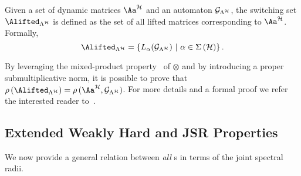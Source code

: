 %
\begin{definition}%
    \label{def:switching_set}%
    Given a set of dynamic matrices $\Aa^{\strat}$ and an automaton $\mathcal{G}_{\Lambda^{\mathcal{H}}}$, the switching set $\Alifted_{\Lambda^\strat}$ is defined as the set of all lifted matrices corresponding to $\Aa^{\strat}$.
    Formally,
    \begin{equation*}
        \Alifted_{\Lambda^\strat} = \left\{ L_{\alpha} ( \GG{\Lambda^\strat} ) \,\, | \,\, \alpha \in \Sigma\left(\strat\right) \right\}.
    \end{equation*}
\end{definition}
%
By leveraging the mixed-product property~\cite{horn2012matrix} of $\otimes$ and by introducing a proper submultiplicative norm, it is possible to prove that $\rho\left(\Alifted_{\Lambda^\strat}\right)= \rho\,(\Aa^{\strat},\GG{\Lambda^\strat})$.
For more details and a formal proof we refer the interested reader to~\cite{xu2020approximation}.


\subsection{Extended Weakly Hard and JSR Properties}
\label{sec:analytic_results}
%
We now provide a general relation between \emph{all} \ewhc{}s in terms of the joint spectral radii.

